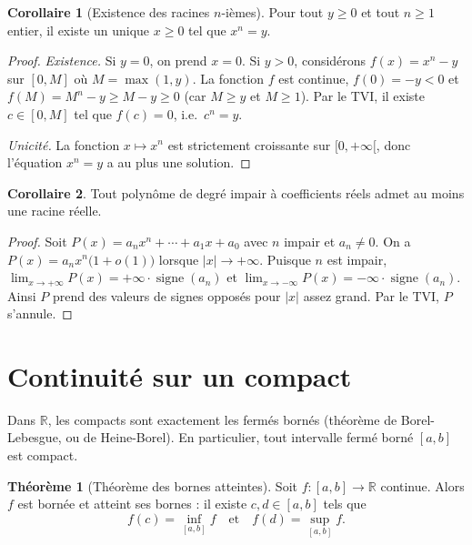 \documentclass[12pt,a4paper,openany]{book}
\theoremstyle{definition}
\newtheorem{theoreme}{Théorème}[chapter]
\newtheorem{corollaire}{Corollaire}[chapter]
\newcommand{\R}{\mathbb{R}}
\begin{document}
\begin{corollaire}[Existence des racines $n$-ièmes]\label{cor:racine-n}
Pour tout $y \geqslant 0$ et tout $n \geqslant 1$ entier, il existe un unique $x \geqslant 0$ tel que $x^n = y$.
\end{corollaire}

\begin{proof}
\emph{Existence.} Si $y = 0$, on prend $x = 0$. Si $y > 0$, considérons $f(x) = x^n - y$ sur $[0, M]$ où $M = \max(1, y)$. La fonction $f$ est continue, $f(0) = -y < 0$ et $f(M) = M^n - y \geqslant M - y \geqslant 0$ (car $M \geqslant y$ et $M \geqslant 1$). Par le TVI, il existe $c \in [0, M]$ tel que $f(c) = 0$, i.e.\ $c^n = y$.

\emph{Unicité.} La fonction $x \mapsto x^n$ est strictement croissante sur $[0, +\infty[$, donc l'équation $x^n = y$ a au plus une solution.
\end{proof}

\begin{corollaire}\label{cor:polynome-impair}
Tout polynôme de degré impair à coefficients réels admet au moins une racine réelle.
\end{corollaire}

\begin{proof}
Soit $P(x) = a_n x^n + \cdots + a_1 x + a_0$ avec $n$ impair et $a_n \neq 0$. On a $P(x) = a_n x^n\bigl(1 + o(1)\bigr)$ lorsque $|x| \to +\infty$. Puisque $n$ est impair, $\lim_{x \to +\infty} P(x) = +\infty \cdot \operatorname{signe}(a_n)$ et $\lim_{x \to -\infty} P(x) = -\infty \cdot \operatorname{signe}(a_n)$. Ainsi $P$ prend des valeurs de signes opposés pour $|x|$ assez grand. Par le TVI, $P$ s'annule.
\end{proof}

\section{Continuité sur un compact}\label{sec:continuite-compact}

Dans $\R$, les compacts sont exactement les fermés bornés (théorème de Borel-Lebesgue, ou de Heine-Borel). En particulier, tout intervalle fermé borné $[a, b]$ est compact.

\begin{theoreme}[Théorème des bornes atteintes]\label{thm:bornes-atteintes}
Soit $f \colon [a, b] \to \R$ continue. Alors $f$ est bornée et atteint ses bornes : il existe $c, d \in [a, b]$ tels que
\[
  f(c) = \inf_{[a,b]} f \quad\text{et}\quad f(d) = \sup_{[a,b]} f.
\]
\end{theoreme}
\end{document}

